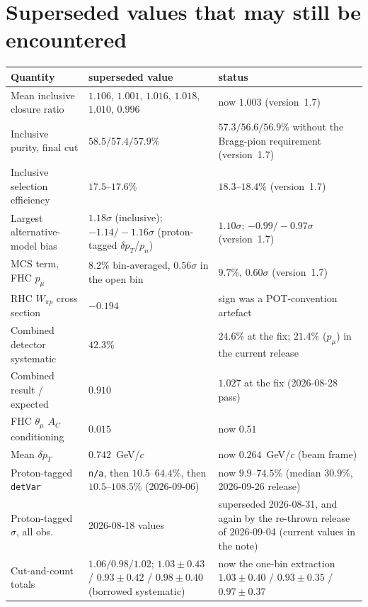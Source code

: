 \section{Superseded values that may still be encountered}

\begin{center}\small\setlength{\tabcolsep}{4pt}
\begin{tabular}{p{4.3cm}p{4.2cm}p{6.4cm}}
\toprule
Quantity & superseded value & status \\
\midrule
Mean inclusive closure ratio        & $1.106$, $1.001$, $1.016$, $1.018$, $1.010$, $0.996$ & now $1.003$ (version~1.7) \\
Inclusive purity, final cut         & $58.5/57.4/57.9\%$ & $57.3/56.6/56.9\%$ without the Bragg-pion requirement (version~1.7) \\
Inclusive selection efficiency      & $17.5$--$17.6\%$ & $18.3$--$18.4\%$ (version~1.7) \\
Largest alternative-model bias      & $1.18\sigma$ (inclusive); $-1.14/-1.16\sigma$ (proton-tagged $\delta p_T$/$p_n$) & $1.10\sigma$; $-0.99/-0.97\sigma$ (version~1.7) \\
MCS term, FHC $p_\mu$              & $8.2\%$ bin-averaged, $0.56\sigma$ in the open bin & $9.7\%$, $0.60\sigma$ (version~1.7) \\
RHC $W_{\pi p}$ cross section       & $-0.194$         & sign was a POT-convention artefact \\
Combined detector systematic        & $42.3\%$         & $24.6\%$ at the fix; $21.4\%$ ($p_\mu$) in the current release \\
Combined result / expected          & $0.910$          & $1.027$ at the fix (2026-08-28 pass) \\
FHC $\theta_\mu$ $A_C$ conditioning & $0.015$          & now $0.51$ \\
Mean $\delta p_T$                   & $0.742$~GeV/$c$  & now $0.264$~GeV/$c$ (beam frame) \\
Proton-tagged \texttt{detVar}       & \texttt{n/a}, then $10.5$--$64.4\%$, then $10.5$--$108.5\%$ (2026-09-06) & now $9.9$--$74.5\%$ (median $30.9\%$, 2026-09-26 release) \\
Proton-tagged $\sigma$, all obs.    & 2026-08-18 values & superseded 2026-08-31, and again by the re-thrown release of 2026-09-04 (current values in the note) \\
Cut-and-count totals                & $1.06/0.98/1.02$; $1.03\pm0.43$ / $0.93\pm0.42$ / $0.98\pm0.40$ (borrowed systematic) & now the one-bin extraction $1.03\pm0.40$ / $0.93\pm0.35$ / $0.97\pm0.37$ \\

\end{tabular}
\end{center}
